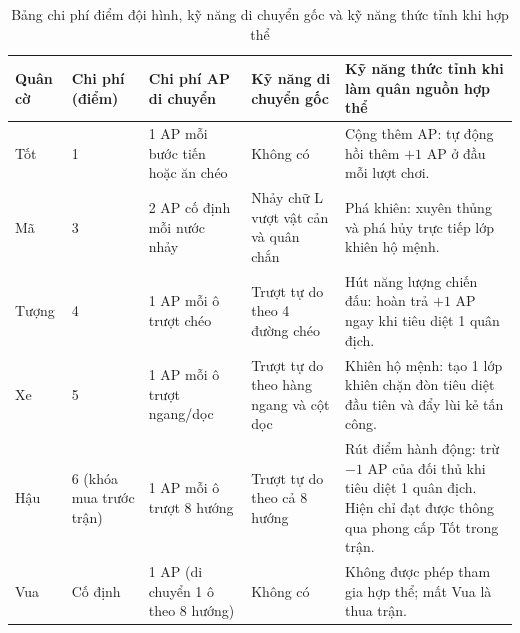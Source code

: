 \begin{table}[H]
    \centering
    \caption{Bảng chi phí điểm đội hình, kỹ năng di chuyển gốc và kỹ năng thức tỉnh khi hợp thể}
    \label{tab:piece_roster}
    \begin{tabularx}{\textwidth}{|L{2.2cm}|C{1.6cm}|L{2.8cm}|L{2.7cm}|Y|}
        \hline
        \textbf{Quân cờ} & \textbf{Chi phí (điểm)} & \textbf{Chi phí AP di chuyển} & \textbf{Kỹ năng di chuyển gốc} & \textbf{Kỹ năng thức tỉnh khi làm quân nguồn hợp thể} \\
        \hline
        Tốt & 1 & 1 AP mỗi bước tiến hoặc ăn chéo & Không có & Cộng thêm AP: tự động hồi thêm $+1$ AP ở đầu mỗi lượt chơi. \\
        \hline
        Mã & 3 & 2 AP cố định mỗi nước nhảy & Nhảy chữ L vượt vật cản và quân chắn & Phá khiên: xuyên thủng và phá hủy trực tiếp lớp khiên hộ mệnh. \\
        \hline
        Tượng & 4 & 1 AP mỗi ô trượt chéo & Trượt tự do theo 4 đường chéo & Hút năng lượng chiến đấu: hoàn trả $+1$ AP ngay khi tiêu diệt 1 quân địch. \\
        \hline
        Xe & 5 & 1 AP mỗi ô trượt ngang/dọc & Trượt tự do theo hàng ngang và cột dọc & Khiên hộ mệnh: tạo 1 lớp khiên chặn đòn tiêu diệt đầu tiên và đẩy lùi kẻ tấn công. \\
        \hline
        Hậu & 6 (khóa mua trước trận) & 1 AP mỗi ô trượt 8 hướng & Trượt tự do theo cả 8 hướng & Rút điểm hành động: trừ $-1$ AP của đối thủ khi tiêu diệt 1 quân địch. Hiện chỉ đạt được thông qua phong cấp Tốt trong trận. \\
        \hline
        Vua & Cố định & 1 AP (di chuyển 1 ô theo 8 hướng) & Không có & Không được phép tham gia hợp thể; mất Vua là thua trận. \\
        \hline
    \end{tabularx}
\end{table}

